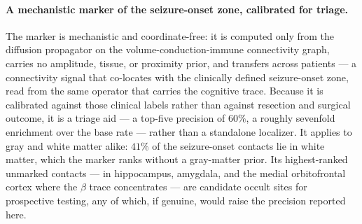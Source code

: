 \paragraph{A mechanistic marker of the seizure-onset zone, calibrated for triage.}
The marker is mechanistic and coordinate-free: it is computed only from the diffusion propagator on the volume-conduction-immune connectivity graph, carries no amplitude, tissue, or proximity prior, and transfers across patients --- a connectivity signal that co-locates with the clinically defined seizure-onset zone, read from the same operator that carries the cognitive trace. Because it is calibrated against those clinical labels rather than against resection and surgical outcome, it is a triage aid --- a top-five precision of \(60\%\), a roughly sevenfold enrichment over the base rate --- rather than a standalone localizer. It applies to gray and white matter alike: \(41\%\) of the seizure-onset contacts lie in white matter, which the marker ranks without a gray-matter prior. Its highest-ranked unmarked contacts --- in hippocampus, amygdala, and the medial orbitofrontal cortex where the \(\beta\) trace concentrates --- are candidate occult sites for prospective testing, any of which, if genuine, would raise the precision reported here.

